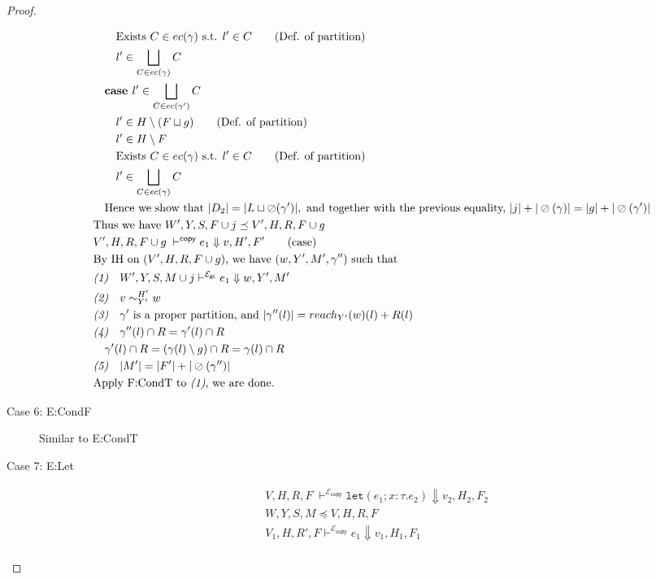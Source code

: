 \documentclass{easychair}
\newcommand{\ms}[1]{\ensuremath{\mathsf{#1}}}
\newcommand{\irl}[1]{\mathtt{#1}}
\newcommand{\veq}[4]{#3 \sim^{#1}_{#2} #4}
\newcommand{\oh}[1]{\oslash(#1)}
\newcommand{\gcSem}{\ensuremath{\mathcal{E}_{\ms{gc}}}}
\newcommand{\copySem}{\ensuremath{\mathcal{E}_{\ms{copy}}}}
\theoremstyle{definition}
\begin{document}
\begin{proof}
\begin{description}
\begin{align*}
		&\quad\quad \text{Exists } C \in ec(\gamma) \text{ s.t. } l' \in C \tag{Def. of partition}\\
		&\quad\quad l' \in \bigsqcup_{C \in ec(\gamma)} C\\
		&\quad\textbf{case } l' \in \bigsqcup_{C \in ec(\gamma')} C\\
		&\quad\quad l' \in H \setminus (F \sqcup g) \tag{Def. of partition}\\
		&\quad\quad l' \in H \setminus F \\
		&\quad\quad \text{Exists } C \in ec(\gamma) \text{ s.t. } l' \in C \tag{Def. of partition}\\
		&\quad\quad l' \in \bigsqcup_{C \in ec(\gamma)} C\\
		&\quad\text{Hence we show that } |D_2| = |L \sqcup \oh{\gamma'}|, \text{ and together with the previous 
		equality, } |j| + |\oh{\gamma}| = |g| + |\oh{\gamma'}|\\
		&\text{Thus we have } W',Y,S,F \cup j \preceq V',H,R,F \cup g\\
  	&V',H,R,F \cup g\; \vdash^{\mathsf{copy}} e_1 \Downarrow v, H',F' \tag{case}\\
		&\text{By IH on $(V',H,R,F\cup g)$, we have } (w,Y',M',\gamma'') \text{ such that }\\
		&\emph{(1)}\quad  W',Y,S,M \cup j  \vdash^{\gcSem} e_1 \Downarrow w,Y',M'\\
		&\emph{(2)}\quad \veq{H'}{Y'}{v}{w}\\
		&\emph{(3)}\quad \gamma' \text{ is a proper partition, and } |\gamma''(l)| = 
			reach_{Y'}(w)(l) + R(l)\\
		&\emph{(4)}\quad \gamma''(l) \cap R = \gamma'(l) \cap R \\
		&\quad \gamma'(l) \cap R = (\gamma(l) \setminus g) \cap R= \gamma(l) \cap R\\
		&\emph{(5)}\quad |M'| = |F'| + |\oh{\gamma''}|\\
		&\text{Apply F:CondT to \emph{(1)}, we are done.}
  \end{align*}
  \item[Case 6: E:CondF] 
  Similar to E:CondT
  \item[Case 7: E:Let]
  \begin{align*}
		&V,H,R,F \; \vdash^{\copySem} \irl{let}(e_1; x : \tau.e_2) \Downarrow v_2,H_2,F_2 \tag{case}\\
		&W,Y,S,M \preceq V,H,R,F \tag{assumption}\\
		&V_1,H,R',F \vdash^{\copySem} e_1 \Downarrow v_1,H_1,F_1 \tag{admissibility}\\

\end{align*}
\end{description}
\end{proof}
\end{document}
